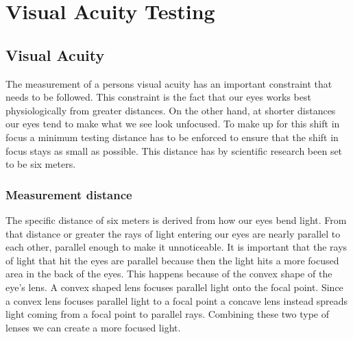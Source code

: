 \documentclass[12pt,a4paper,notitlepage]{report}
\begin{document}
%

\chapter{Visual Acuity Testing}
\section{Visual Acuity}
The measurement of a persons visual acuity has an important constraint that needs to be followed. This constraint is the fact that our eyes works best physiologically from greater distances. On the other hand, at shorter distances our eyes tend to make what we see look unfocused. To make up for this shift in focus a minimum testing distance has to be enforced to ensure that the shift in focus stays as small as possible. This distance has by scientific research been set to be six meters.

\subsection{Measurement distance}
The specific distance of six meters is derived from how our eyes bend light. From that distance or greater the rays of light entering our eyes are nearly parallel to each other, parallel enough to make it unnoticeable. It is important that the rays of light that hit the eyes are parallel because then the light hits a more focused area in the back of the eyes. This happens because of the convex shape of the eye's lens. A convex shaped lens focuses parallel light onto the focal point. Since a convex lens focuses parallel light to a focal point a concave lens instead spreads light coming from a focal point to parallel rays. Combining these two type of lenses we can create a more focused light. 
\end{document}
